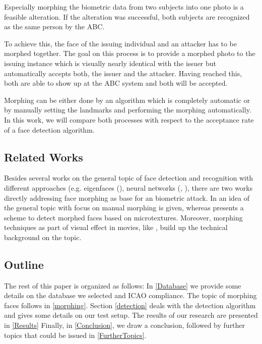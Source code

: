 Especially morphing the biometric data from two subjects into one photo is a feasible alteration. If the alteration was successful, both subjects are recognized as the same person by the ABC. 

To achieve this, the face of the issuing individual and an attacker has to be morphed together. The goal on  this process is to provide a morphed photo to the issuing instance which is visually nearly identical with the issuer but automatically accepts both, the issuer and the attacker. Having reached this, both are able to show up at the ABC system and both will be accepted. 

Morphing can be either done by an algorithm which is completely automatic or by manually setting the landmarks and performing the morphing automatically. In this work, we will compare both processes with respect to the acceptance rate of a face detection algorithm. 

\subsection{Related Works}
Besides several works on the general topic of face detection \cite{jagathishwaran2014survey} and recognition with different approaches (e.g. eigenfaces (\cite{turk1991face}), neural networks (\cite{rowley1998neural}, \cite{lawrence1997face}), there are two works directly addressing face morphing as base for an biometric attack. In \cite{ferrara2014magic} an idea of the general topic with focus on manual morphing is given, whereas \cite{raghavendra2016detecting} presents a scheme to detect morphed faces based on microtextures.
Moreover, morphing techniques as part of visual effect in movies, like \cite{wolberg1998image}, build up the technical background on the topic. 

\subsection{Outline}
The rest of this paper is organized as follows: In \autoref{Database} we provide some details on the database we selected and ICAO compliance. The topic of morphing faces follows in \autoref{morphing}. Section \ref{detection} deals with the detection algorithm and gives some details on our test setup. The results of our research are presented in \autoref{Results} Finally, in \autoref{Conclusion}, we draw a conclusion, followed by further topics that could be issued in \autoref{FurtherTopics}.
 